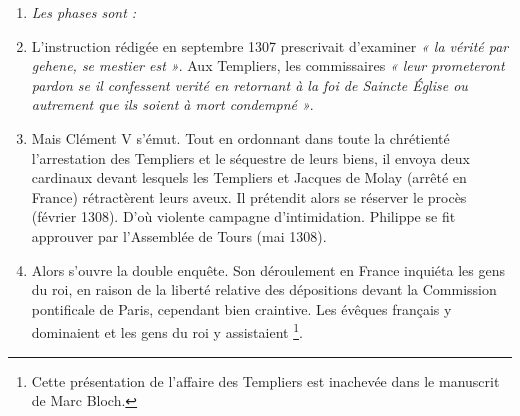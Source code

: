 \documentclass[french,twoside]{book} %
\newlength{\listmod}
\newcommand{\listhead}[1]{\hspace{-1\listmod}\emph{#1}}
\newcommand\chapterclose{} %
\begin{document}
\begin{enumerate}[itemsep=\baselineskip,]
\item[]\listhead{Les phases sont :}
\item 
{}L’instruction rédigée en septembre 1307 prescrivait d’examiner \emph{« la vérité par gehene, se mestier est »}. Aux Templiers, les commissaires \emph{« leur prometeront pardon se il confessent verité en retornant à la foi de Saincte Église ou autrement que ils soient à mort condempné »}.

\item Mais Clément V s’émut. Tout en ordonnant dans toute la chrétienté l’arrestation des Templiers et le séquestre de leurs biens, il envoya deux cardinaux devant lesquels les Templiers et Jacques de Molay (arrêté en France) rétractèrent leurs aveux. Il prétendit alors se réserver le procès (février 1308). D’où violente campagne d’intimidation. Philippe se fit approuver par l’Assemblée de Tours (mai 1308).\par

\item Alors s’ouvre la double enquête. Son déroulement en France inquiéta les gens du roi, en raison de la liberté relative des dépositions devant la Commission pontificale de Paris, cependant bien craintive. Les évêques français y dominaient et les gens du roi y assistaient \footnote{Cette présentation de l’affaire des Templiers est inachevée dans le manuscrit de Marc Bloch.}.


\end{enumerate}\chapterclose
\end{document}
